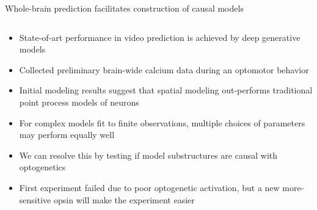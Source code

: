 \begin{frame}{Whole-brain prediction facilitates construction of causal models}
  \begin{columns}[t]
  \end{columns}
\end{frame}

\begin{frame}{\aimOne}
  \textbf{\qOne}
  \begin{itemize}
    \item State-of-art performance in video prediction is achieved by deep generative models
    \item Collected preliminary brain-wide calcium data during an optomotor behavior
    \item Initial modeling results suggest that spatial modeling out-performs traditional point process models of neurons
  \end{itemize}
\end{frame}

\begin{frame}{\aimTwo}
  \textbf{\qTwo}
  \begin{itemize}
    \item For complex models fit to finite observations, multiple choices of parameters may perform equally well
    \item We can resolve this by testing if model substructures are causal with optogenetics
    \item First experiment failed due to poor optogenetic activation, but a new more-sensitive opsin will make the experiment easier
  \end{itemize}
\end{frame}

